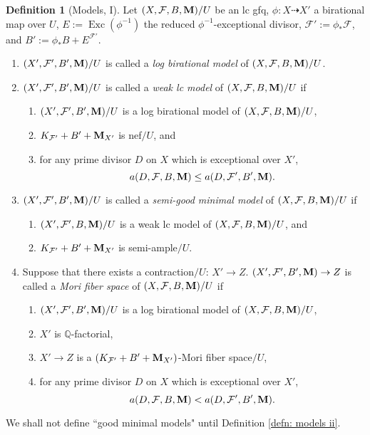 \documentclass[11pt]{amsart}
\numberwithin{equation}{section}
\newcommand{\Mm}{{\bf{M}}}
\newcommand{\Qq}{\mathbb{Q}}
\newcommand{\Exc}{\operatorname{Exc}}
\newcommand{\Ff}{\mathcal{F}}
\theoremstyle{definition}
\newtheorem{defn}[thm]{Definition}
\theoremstyle{definition}
\theoremstyle{definition}
\begin{document}
\begin{defn}[Models, I]\label{defn: models I}
Let $(X,\Ff,B,\Mm)/U$ be an lc gfq, $\phi: X\dashrightarrow X'$ a birational map over $U$, $E:=\Exc(\phi^{-1})$ the reduced $\phi^{-1}$-exceptional divisor, $\Ff':=\phi_*\Ff$, and $B':=\phi_*B+E^{\Ff'}$.
\begin{enumerate}
    \item $(X',\Ff',B',\Mm)/U$ is called a \emph{log birational model} of $(X,\Ff,B,\Mm)/U$. 
    \item $(X',\Ff',B',\Mm)/U$ is called a \emph{weak lc model} of $(X,\Ff,B,\Mm)/U$ if 
\begin{enumerate}
\item $(X',\Ff',B',\Mm)/U$ is a log birational model of $(X,\Ff,B,\Mm)/U$, 
    \item $K_{\Ff'}+B'+\Mm_{X'}$ is nef$/U$, and
    \item for any prime divisor $D$ on $X$ which is exceptional over $X'$, $$a(D,\Ff,B,\Mm)\leq a(D,\Ff',B',\Mm).$$
\end{enumerate}
\item $(X',\Ff',B',\Mm)/U$ is called a \emph{semi-good minimal model} of $(X,\Ff,B,\Mm)/U$ if
\begin{enumerate}
        \item $(X',\Ff',B,\Mm)/U$ is a weak lc model of $(X,\Ff,B,\Mm)/U$, and
        \item $K_{\Ff'}+B'+\Mm_{X'}$ is semi-ample$/U$.
\end{enumerate}
\item  Suppose that there exists a contraction$/U$: $X'\rightarrow Z$. $(X',\Ff',B',\Mm)\rightarrow Z$ is called a \emph{Mori fiber space} of $(X,\Ff,B,\Mm)/U$ if
\begin{enumerate}
    \item  $(X',\Ff',B',\Mm)/U$ is a log birational model of $(X,\Ff,B,\Mm)/U$,
    \item $X'$ is $\Qq$-factorial,
    \item $X'\rightarrow Z$ is a $(K_{\Ff'}+B'+\Mm_{X'})$-Mori fiber space$/U$,
    \item for any prime divisor $D$ on $X$ which is exceptional over $X'$, $$a(D,\Ff,B,\Mm)<a(D,\Ff',B',\Mm).$$
\end{enumerate}
\end{enumerate}
We shall not define ``good minimal models" until Definition \ref{defn: models ii}.
\end{defn}
\end{document}
